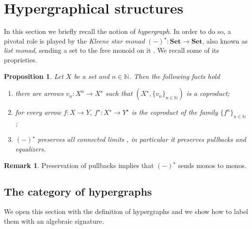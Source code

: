 \documentclass[a4paper,UKenglish,cleveref,pdftex,amsthm,thm-restate,numberwithinsect]{cas-sc}
\theoremstyle{plain}
\newtheorem{proposition}[theorem]{Proposition}
\theoremstyle{definition}
\newtheorem{remark}[theorem]{Remark}
\newcommand{\lgh}{\mathsf{lg}}
\newcommand{\Set}{\mathbf{Set}}
\def\X{\textbf {\textup{X}}}
\begin{document}
\section{Hypergraphical structures}\label{sec:hyper}

In this section we briefly recall the notion of \emph{hypergraph}. In order to do so, a pivotal role is played by the \emph{Kleene star monad} $(-)^\star\colon \Set\to \Set$, also known as 
\emph{list monad},
sending a set to the free monoid on it \cite{sakarovitch2009elements,Wadler95}.
We recall some of its proprieties.

\begin{proposition}\label{prop:fact}
	Let $X$ be a set and $n\in \mathbb{N}$. Then the following facts hold
	\begin{enumerate}
		\item there are arrows $v_{n}\colon X^n\to X^\star $ such that $(X^\star, \{v_{n}\}_{n\in \mathbb{N}})$ is a coproduct;
		\item for every arrow $f\colon X\to Y$, $f^\star\colon X^\star \to Y^\star$ is the coproduct of the family $\{f^n\}_{n\in \mathbb{N}}$;
		\item $(-)^\star$ preserves all \emph{connected limits} \cite{carboni1995connected}, in particular it preserves pullbacks and equalizers.
	\end{enumerate}
\end{proposition}

\begin{remark}\label{rem:mono}
	Preservation of pullbacks implies that $(-)^\star$ sends monos to monos.
\end{remark}


\subsection{The category of hypergraphs}

We open this section with the definition of hypergraphs and we show how to label them with an algebraic signature.  
\end{document}
